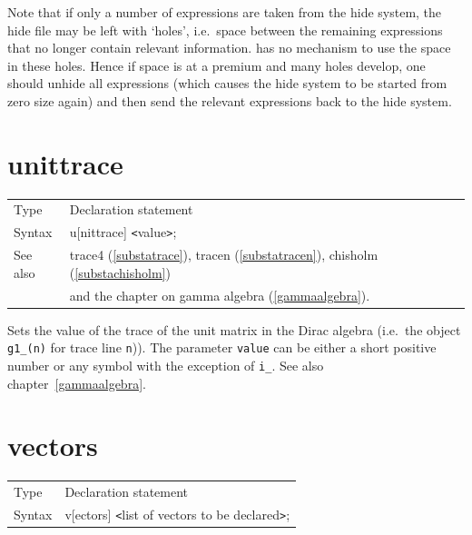 \noindent Note that if only a number of expressions are taken from the hide 
system, the hide file may be left with `holes', i.e.\ space between the 
remaining expressions that no longer contain relevant information. 
{\FORM} has no mechanism to use the space in these holes. Hence if 
space is at a premium and many holes develop, one should unhide all 
expressions (which causes the hide system to be started from zero size 
again) and then send the relevant expressions back to the hide system. 
\vspace{10mm}


\section{unittrace}
\label{substaunittrace}

\noindent \begin{tabular}{ll}
Type & Declaration statement\\
Syntax & u[nittrace] {\tt<}value{\tt>}; \\
See also & trace4 (\ref{substatrace}), tracen (\ref{substatracen}),
    chisholm (\ref{substachisholm}) \\ &
    and the chapter on gamma algebra (\ref{gammaalgebra}).
\end{tabular} \vspace{4mm}

\noindent Sets the value of the trace of the 
unit matrix in the Dirac 
algebra (i.e.\ the object \verb:g1_(n): for trace line 
\verb:n:)). The parameter \verb:value: can be either a short positive 
number or any symbol with the exception of \verb:i_:. See also 
chapter~\ref{gammaalgebra}. \vspace{10mm}


\section{vectors}
\label{substavectors}

\noindent \begin{tabular}{ll}
Type & Declaration statement\\
Syntax & v[ectors] {\tt<}list of vectors to be declared{\tt>};
\end{tabular} \vspace{4mm}

